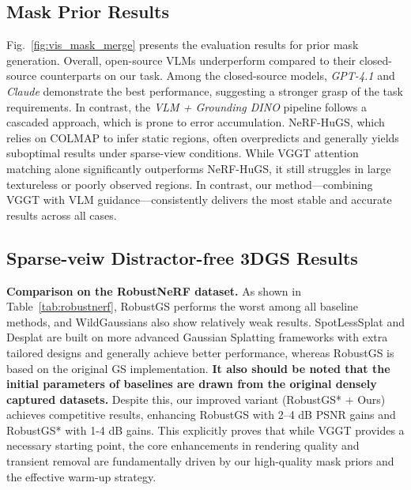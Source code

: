 \documentclass[letterpaper, 10 pt, conference]{ieeeconf}  %
\begin{document}
\subsection{Mask Prior Results}
\label{mask_res}
Fig.~\ref{fig:vis_mask_merge} presents the evaluation results for prior mask generation. Overall, open-source VLMs underperform compared to their closed-source counterparts on our task. Among the closed-source models, \textit{GPT-4.1} and \textit{Claude} demonstrate the best performance, suggesting a stronger grasp of the task requirements. In contrast, the \textit{VLM + Grounding DINO} pipeline follows a cascaded approach, which is prone to error accumulation. NeRF-HuGS, which relies on COLMAP to infer static regions, often overpredicts and generally yields suboptimal results under sparse-view conditions. While VGGT attention matching alone significantly outperforms NeRF-HuGS, it still struggles in large textureless or poorly observed regions. In contrast, our method—combining VGGT with VLM guidance—consistently delivers the most stable and accurate results across all cases.


% 



\subsection{Sparse-veiw Distractor-free 3DGS Results}
\noindent
\textbf{Comparison on the RobustNeRF dataset.} As shown in Table~\ref{tab:robustnerf}, RobustGS performs the worst among all baseline methods, and WildGaussians also show relatively weak results. SpotLessSplat and Desplat are built on more advanced Gaussian Splatting frameworks with extra tailored designs and generally achieve better performance, whereas RobustGS is based on the original GS implementation. \textbf{It also should be noted that the initial parameters of baselines are drawn from the original densely captured datasets.} Despite this, our improved variant (RobustGS* + Ours) achieves competitive results, enhancing RobustGS with 2–4 dB PSNR gains and RobustGS* with 1-4 dB gains. This explicitly proves that while VGGT provides a necessary starting point, the core enhancements in rendering quality and transient removal are fundamentally driven by our high-quality mask priors and the effective warm-up strategy.

\end{document}
